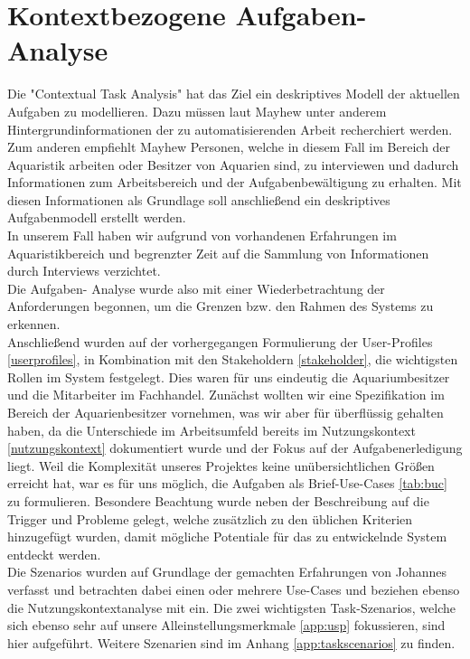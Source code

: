 \chapter{Kontextbezogene Aufgaben-Analyse}\label{taskanalysis}

Die "Contextual Task Analysis" hat das Ziel ein deskriptives Modell der aktuellen Aufgaben zu modellieren. Dazu müssen laut Mayhew unter anderem Hintergrundinformationen der zu automatisierenden Arbeit recherchiert werden. Zum anderen empfiehlt Mayhew Personen, welche in diesem Fall im Bereich der Aquaristik arbeiten oder Besitzer von Aquarien sind, zu interviewen und dadurch Informationen zum Arbeitsbereich und der Aufgabenbewältigung zu erhalten. Mit diesen Informationen als Grundlage soll anschließend ein deskriptives Aufgabenmodell erstellt werden. \\

In unserem Fall haben wir aufgrund von  vorhandenen Erfahrungen im Aquaristikbereich und begrenzter Zeit auf die Sammlung von Informationen durch Interviews verzichtet. \\ 

Die Aufgaben- Analyse wurde also mit einer Wiederbetrachtung der Anforderungen begonnen, um die Grenzen bzw. den Rahmen des Systems zu erkennen. \\

Anschließend wurden auf der vorhergegangen Formulierung der User-Profiles \ref{userprofiles}, in Kombination mit den Stakeholdern \ref{stakeholder}, die wichtigsten Rollen im System festgelegt. Dies waren für uns eindeutig die Aquariumbesitzer und die Mitarbeiter im Fachhandel. Zunächst wollten wir eine Spezifikation im Bereich der Aquarienbesitzer vornehmen, was wir aber für überflüssig gehalten haben, da die Unterschiede im Arbeitsumfeld bereits im Nutzungskontext \ref{nutzungskontext} dokumentiert wurde und der Fokus auf der Aufgabenerledigung liegt. Weil die Komplexität unseres Projektes  keine unübersichtlichen Größen erreicht hat, war es für uns möglich, die Aufgaben als Brief-Use-Cases \ref{tab:buc} zu formulieren. Besondere Beachtung wurde neben der Beschreibung auf die Trigger und Probleme gelegt, welche zusätzlich zu den üblichen Kriterien hinzugefügt wurden, damit mögliche Potentiale für das zu entwickelnde System entdeckt werden. \\



Die Szenarios wurden auf Grundlage der gemachten Erfahrungen von Johannes verfasst und betrachten dabei einen oder mehrere Use-Cases und beziehen ebenso die Nutzungskontextanalyse mit ein. Die zwei wichtigsten Task-Szenarios, welche sich ebenso sehr auf unsere Alleinstellungsmerkmale \ref{app:usp} fokussieren, sind hier aufgeführt. Weitere Szenarien sind im Anhang \ref{app:taskscenarios} zu finden.\\

